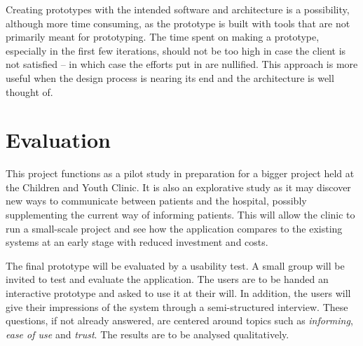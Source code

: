 Creating prototypes with the intended software and architecture is a possibility, although more time consuming, as the prototype is built with tools that are not primarily meant for prototyping. The time spent on making a prototype, especially in the first few iterations, should not be too high in case the client is not satisfied -- in which case the efforts put in are nullified. This approach is more useful when the design process is nearing its end and the architecture is well thought of.


\section{Evaluation}
\label{sec:evaluation}

This project functions as a pilot study in preparation for a bigger project held at the Children and Youth Clinic. It is also an explorative study as it may discover new ways to communicate between patients and the hospital, possibly supplementing the current way of informing patients. This will allow the clinic to run a small-scale project and see how the application compares to the existing systems at an early stage with reduced investment and costs.

The final prototype will be evaluated by a usability test. A small group will be invited to test and evaluate the application. The users are to be handed an interactive prototype and asked to use it at their will. In addition, the users will give their impressions of the system through a semi-structured interview. These questions, if not already answered, are centered around topics such as \emph{informing}, \emph{ease of use} and \emph{trust}. The results are to be analysed qualitatively.

